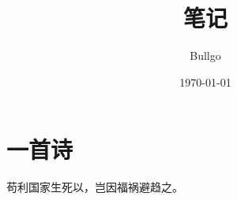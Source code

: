 \documentclass[UTF8]{ctexart}
\title{笔记}
\author{Bullgo}
\date{\today}
\begin{document}
    \maketitle

    \tableofcontents    
    \newpage

    \section{一首诗}
    苟利国家生死以，岂因福祸避趋之。


    



    
\end{document}
